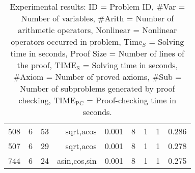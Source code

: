 \begin{table}
\begin{center}
\begin{tabular}{|l||r|r|r||r|r|r|r|r|}
508 & 6 & 53 & sqrt,acos & 0.001 & 8 & 1 & 1 & 0.286 \\
507 & 6 & 29 & sqrt,acos & 0.001 & 8 & 1 & 1 & 0.278 \\
744 & 6 & 24 & asin,cos,sin & 0.001 & 8 & 1 & 1 & 0.275\\
\hline
\end{tabular}
  \end{center}
  \caption{
    Experimental results:
    ID = Problem ID,
    \#Var = Number of variables,
    \#Arith = Number of arithmetic operators,
    Nonlinear = Nonlinear operators occurred in problem,
    Time$_S$ = Solving time in seconds,
    Proof Size = Number of lines of the proof,
    $\mathrm{TIME_S}$ = Solving time in seconds,
    \#Axiom = Number of proved axioms,
    \#Sub = Number of subproblems generated by proof checking,
    $\mathrm{TIME_{PC}}$ = Proof-checking time in seconds.
  }\label{tbl:exp}
\end{table}

